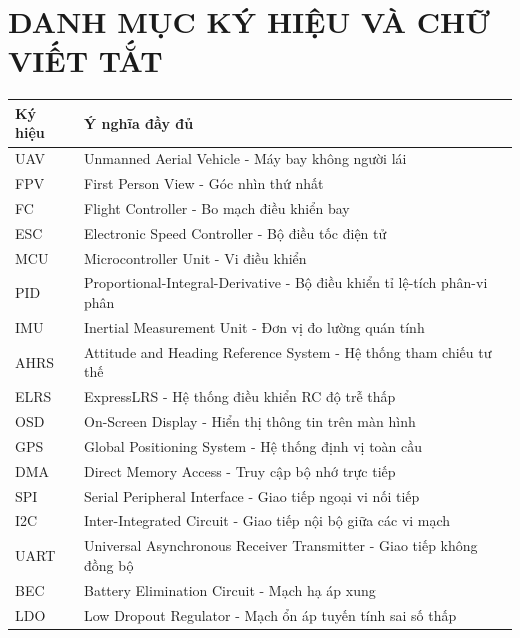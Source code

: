 \section*{DANH MỤC KÝ HIỆU VÀ CHỮ VIẾT TẮT}

\begin{center}
\renewcommand{\arraystretch}{1.5}
\begin{tabular}{|l|l|}
\hline
\textbf{Ký hiệu} & \textbf{Ý nghĩa đầy đủ} \\ \hline
UAV & \parbox[t]{11cm}{\raggedright Unmanned Aerial Vehicle - Máy bay không người lái} \\ \hline
FPV & \parbox[t]{11cm}{\raggedright First Person View - Góc nhìn thứ nhất} \\ \hline
FC & \parbox[t]{11cm}{\raggedright Flight Controller - Bo mạch điều khiển bay} \\ \hline
ESC & \parbox[t]{11cm}{\raggedright Electronic Speed Controller - Bộ điều tốc điện tử} \\ \hline
MCU & \parbox[t]{11cm}{\raggedright Microcontroller Unit - Vi điều khiển} \\ \hline
PID & \parbox[t]{11cm}{\raggedright Proportional-Integral-Derivative - Bộ điều khiển tỉ lệ-tích phân-vi phân} \\ \hline
IMU & \parbox[t]{11cm}{\raggedright Inertial Measurement Unit - Đơn vị đo lường quán tính} \\ \hline
AHRS & \parbox[t]{11cm}{\raggedright Attitude and Heading Reference System - Hệ thống tham chiếu tư thế} \\ \hline
ELRS & \parbox[t]{11cm}{\raggedright ExpressLRS - Hệ thống điều khiển RC độ trễ thấp} \\ \hline
OSD & \parbox[t]{11cm}{\raggedright On-Screen Display - Hiển thị thông tin trên màn hình} \\ \hline
GPS & \parbox[t]{11cm}{\raggedright Global Positioning System - Hệ thống định vị toàn cầu} \\ \hline
DMA & \parbox[t]{11cm}{\raggedright Direct Memory Access - Truy cập bộ nhớ trực tiếp} \\ \hline
SPI & \parbox[t]{11cm}{\raggedright Serial Peripheral Interface - Giao tiếp ngoại vi nối tiếp} \\ \hline
I2C & \parbox[t]{11cm}{\raggedright Inter-Integrated Circuit - Giao tiếp nội bộ giữa các vi mạch} \\ \hline
UART & \parbox[t]{11cm}{\raggedright Universal Asynchronous Receiver Transmitter - Giao tiếp không đồng bộ} \\ \hline
BEC & \parbox[t]{11cm}{\raggedright Battery Elimination Circuit - Mạch hạ áp xung} \\ \hline
LDO & \parbox[t]{11cm}{\raggedright Low Dropout Regulator - Mạch ổn áp tuyến tính sai số thấp} \\ \hline
\end{tabular}
\end{center}
